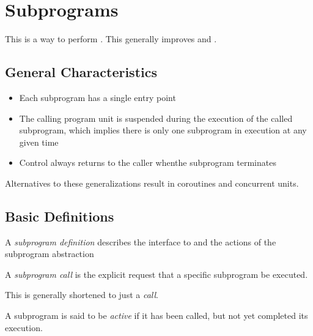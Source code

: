 \section{Subprograms}\label{sec:Subprograms}
This is a way to perform .
This generally improves  and .

\subsection{General Characteristics}\label{subsec:Suprogram_Characteristics}
\begin{itemize}[noitemsep]
\item Each subprogram has a single entry point
\item The calling program unit is suspended during the execution of the called subprogram, which implies there is only one subprogram in execution at any given time
\item Control always returns to the caller whenthe subprogram terminates
\end{itemize}

Alternatives to these generalizations result in coroutines and concurrent units.

\subsection{Basic Definitions}\label{subsec:Subprogram_Definitions}
\begin{definition}\label{def:Subprogram_Definition}
  A \emph{subprogram definition} describes the interface to and the actions of the subprogram abstraction
\end{definition}

\begin{definition}\label{def:Subprogram_Call}
  A \emph{subprogram call} is the explicit request that a specific subprogram be executed.

  \begin{remark}[Call]\label{rmk:Subprogram_Call}
    This is generally shortened to just a \emph{call}.
  \end{remark}
\end{definition}

\begin{definition}[Active]\label{def:Subprogram_Active}
  A subprogram is said to be \emph{active} if it has been called, but not yet completed its execution.
\end{definition}

